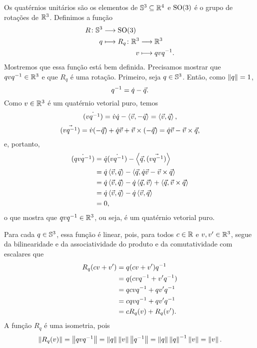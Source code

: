 Os quatérnios unitários são os elementos de $\S^3 \subseteq \R^4$ e $\SO(3)$ é o grupo de rotações de $\R^3$. Definimos a função
	\begin{align*}
	\func{R}{\S^3}{\SO(3)}{q}{
		\begin{aligned}[t]
		\func{R_q}{\R^3}{\R^3}{v}{qvq\inv}.
		\end{aligned}
		}
	\end{align*}
Mostremos que essa função está bem definida. Precisamos mostrar que $qvq\inv \in \R^3$ e que $R_q$ é uma rotação. Primeiro, seja $q \in \S^3$. Então, como $\nor{q}=1$,
	\begin{equation*}
	q\inv = \esc{q}-\vec{q}.
	\end{equation*}
Como $v \in \R^3$ é um quatérnio vetorial puro, temos
	\begin{equation*}
	\esc{(vq\inv)} = \esc{v}\esc{q} - \inte{\vec{v}}{-\vec{q}} = \inte{\vec{v}}{\vec{q}},
	\end{equation*}
	\begin{equation*}
	\vec{(vq\inv)} = \esc{v}(-\vec{q})+\esc{q}\vec{v}+\vec{v} \times (-\vec{q}) = \esc{q}\vec{v}-\vec{v} \times \vec{q},
	\end{equation*}
e, portanto,
	\begin{align*}
	\esc{(qvq\inv)} &= \esc{q}\esc{(vq\inv)} - \inte{\vec{q}}{\vec{(vq\inv)}} \\
		&= \esc{q}\inte{\vec{v}}{\vec{q}} - \inte{\vec{q}}{\esc{q}\vec{v}-\vec{v} \times \vec{q}} \\
		&= \esc{q}\inte{\vec{v}}{\vec{q}}-\esc{q}\inte{\vec{q}}{\vec{v}}+\inte{\vec{q}}{\vec{v} \times \vec{q}} \\
		&= \esc{q}\inte{\vec{v}}{\vec{q}}-\esc{q}\inte{\vec{v}}{\vec{q}} \\
		&= 0,
	\end{align*}
o que mostra que $qvq\inv \in \R^3$, ou seja, é um quatérnio vetorial puro.

Para cada $q \in \S^3$, essa função é linear, pois, para todos $c \in \R$ e $v,v' \in \R^3$, segue da bilinearidade e da associatividade do produto e da comutatividade com escalares que
	\begin{align*}
	R_q(cv+v') &= q(cv+v')q\inv \\
		&= q(cvq\inv+v'q\inv) \\
		&= qcvq\inv + qv'q\inv \\
		&= cqvq\inv + qv'q\inv \\
		&= cR_q(v) + R_q(v').
	\end{align*}
A função $R_q$ é uma isometria, pois
	\begin{equation*}
	\nor{R_q(v)} = \nor{qvq\inv} = \nor{q}\nor{v}\nor{q\inv} = \nor{q}\nor{q}\inv\nor{v} = \nor{v}.
	\end{equation*}

